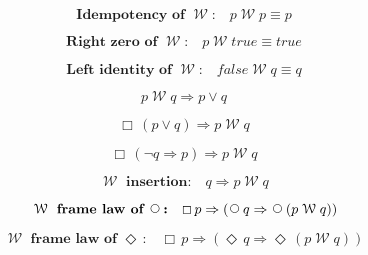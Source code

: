 \documentclass[12pt, fleqn, leqno]{article}
\newcommand{\impl}{\ensuremath{\Rightarrow}}        %
\newcommand{\Wait}{\;\mathcal{W}\;}
\newcommand{\Next}{\;\,\text{\raisebox{3.5pt}{\circle{6}}}}
\newcommand{\Event}{\Diamond\,}
\newcommand{\Always}{\Box\,}
\newcommand{\spacer}{\vspace{-30pt}}
\begin{document}
\spacer

\begin{equation}\label{E:idempWait}
\textbf{Idempotency of $\Wait$:}\quad p \Wait p \equiv p
\end{equation}

\spacer

\begin{equation}\label{E:rightZeroWait}
\textbf{Right zero of $\Wait$:}\quad p \Wait true \equiv true
\end{equation}

\spacer

\begin{equation}\label{E:leftIdentWait}
\textbf{Left identity of $\Wait$:}\quad false \Wait q \equiv q
\end{equation}

\spacer

\begin{equation}\label{E:waitToOr}
p \Wait q \impl p \lor q
\end{equation}

\spacer

\begin{equation}\label{E:orToWait}
\Always (p\lor q) \impl p \Wait q
\end{equation}

\spacer

\begin{equation}\label{E:notqimpliespToWait}
\Always (\neg q \impl p) \impl p \Wait q
\end{equation}

\spacer

\begin{equation}\label{E:waitInsertion}
\textbf{$\Wait$ insertion:}\quad q \impl p \Wait q
\end{equation}

\spacer

\begin{equation}\label{E:waitframelawnext}
\textbf{$\Wait$ frame law of $\Next$:}\quad \Always p \impl (\Next q \impl \Next (p \Wait q))
\end{equation}

\spacer

\begin{equation}\label{E:waitframelawEvent}
\textbf{$\Wait$ frame law of $\Event$:}\quad \Always p \impl (\Event q \impl \Event (p \Wait q))
\end{equation}
\end{document}
